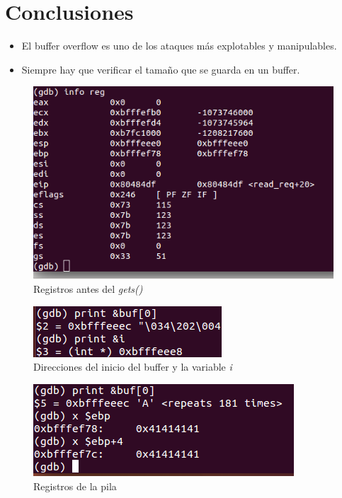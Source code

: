 \documentclass[a4paper,12pt]{article}
\begin{document}
\section{Conclusiones}

\begin{itemize}
 \item El buffer overflow es uno de los ataques más explotables y manipulables.
 \item Siempre hay que verificar el tamaño que se guarda en un buffer.
\end{itemize}


\begin{figure}[b]
 \centering
 \includegraphics[scale=0.5]{1.png}
 \caption{Registros antes del \textit{gets()}}
 \label{fig:1}
\end{figure}

\begin{figure}
 \centering
 \includegraphics[scale=1]{2.png}
 \caption{Direcciones del inicio del buffer y la variable \textit{i}}
 \label{fig:2}
\end{figure}

\begin{figure}
 \centering
 \includegraphics[scale=0.7]{3.png}
 \caption{Registros de la pila}
 \label{fig:3}
\end{figure}
\end{document}
